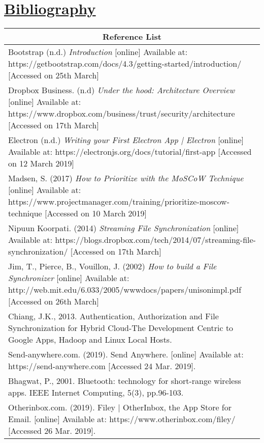 \documentclass{article}
\begin{document}
\section{\underline{Bibliography}}
\begin{tabular}{|p{12.2cm}|}
\hline
\multicolumn{1}{|c|}{\textbf{Reference List}} \\
\hline
Bootstrap (n.d.) \textit{Introduction} [online] Available at: https://getbootstrap.com/docs/4.3/getting-started/introduction/ [Accessed on 25th March] \\
\hline
Dropbox Business. (n.d) \textit{Under the hood: Architecture Overview} [online] Available at: https://www.dropbox.com/business/trust/security/architecture [Accessed on 17th March] \\
\hline
Electron (n.d.) \textit{Writing your First Electron App | Electron} [online] Available at: https://electronjs.org/docs/tutorial/first-app [Accessed on 12 March 2019] \\
\hline
Madsen, S. (2017) \textit{How to Prioritize with the MoSCoW Technique} [online] Available at: https://www.projectmanager.com/training/prioritize-moscow-technique [Accessed on 10 March 2019] \\
\hline
Nipuun Koorpati. (2014) \textit{Streaming File Synchronization } [online] Available at: https://blogs.dropbox.com/tech/2014/07/streaming-file-synchronization/ [Accessed on 17th March] \\
\hline 
Jim, T., Pierce, B., Vouillon, J.  (2002) \textit{How to build a File Synchronizer} [online] Available at: http://web.mit.edu/6.033/2005/wwwdocs/papers/unisonimpl.pdf [Accessed on 26th March] \\
\hline
Chiang, J.K., 2013. Authentication, Authorization and File Synchronization for Hybrid Cloud-The Development Centric to Google Apps, Hadoop and Linux Local Hosts. \\
\hline
Send-anywhere.com. (2019). Send Anywhere. [online] Available at: https://send-anywhere.com [Accessed 24 Mar. 2019]. \\
\hline
 Bhagwat, P., 2001. Bluetooth: technology for short-range wireless apps. IEEE Internet Computing, 5(3), pp.96-103. \\
\hline
Otherinbox.com. (2019). Filey | OtherInbox, the App Store for Email. [online] Available at: https://www.otherinbox.com/filey/ [Accessed 26 Mar. 2019]. \\
\hline
\end{tabular}
\end{document}
